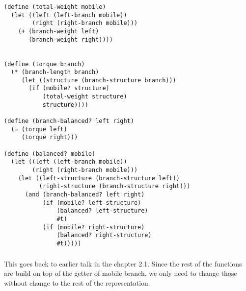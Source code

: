 \documentclass{article}
\begin{document}
\subsubsection{}
\begin{verbatim}
(define (total-weight mobile)
  (let ((left (left-branch mobile))
        (right (right-branch mobile)))
    (+ (branch-weight left)
       (branch-weight right))))


(define (torque branch)
  (* (branch-length branch)
     (let ((structure (branch-structure branch)))
       (if (mobile? structure)
           (total-weight structure)
           structure))))

(define (branch-balanced? left right)
  (= (torque left)
     (torque right)))

(define (balanced? mobile)
  (let ((left (left-branch mobile))
        (right (right-branch mobile)))
    (let ((left-structure (branch-structure left))
          (right-structure (branch-structure right)))
      (and (branch-balanced? left right)
           (if (mobile? left-structure)
               (balanced? left-structure)
               #t)
           (if (mobile? right-structure)
               (balanced? right-structure)
               #t)))))
               \end{verbatim}
\subsubsection{}
This goes back to earlier talk in the chapter 2.1. Since the rest of the functions are build on top of the getter of mobile branch, we only need to change those without change to the rest of the representation.
\end{document}
